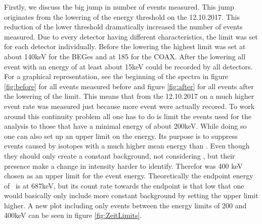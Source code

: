 \documentclass[encoding=utf8,british]{tumphthesis}
\begin{document}
Firstly, we discuss the big jump in number of events measured.
This jump originates from the lowering of the energy threshold on the 12.10.2017.
This reduction of the lower threshold dramatically increased the number of events measured.
Due to every detector having different characteristics, the limit was set for each detector individually.
Before the lowering the highest limit was set at about 140keV for the BEGes and at 185 for the COAX.
After the lowering all event with an energy of at least about 15keV could be recorded by all detectors.
For a graphical representation, see the beginning of the spectra in figure \ref{fig:before} for all events measured before and figure \ref{fig:after} for all events after the lowering of the limit. 
This means that from the 12.10.2017 on a much higher event rate was measured just because more event were actually recored.
To work around this continuity problem all one has to do is limit the events used for the analysis to those that have a minimal energy of about 200keV. 
While doing so one can also set up an upper limit on the energy.
Its purpose is to suppress events caused by isotopes with a much higher  mean energy than \Kr.
Even though they should only create a constant background, not considering , but their presence make a change in intensity harder to identify.
Therefor was 400 keV chosen as an upper limit for the event energy.
Theoretically the endpoint energy of \Kr\ is at 687keV, but its count rate towards the endpoint is that low that one would basically only include more constant background by setting the upper limit higher.
A new plot including only events between the energy limits of 200 and 400keV can be seen in figure \ref{fig:ZeitLimits}.
\\
\end{document}
